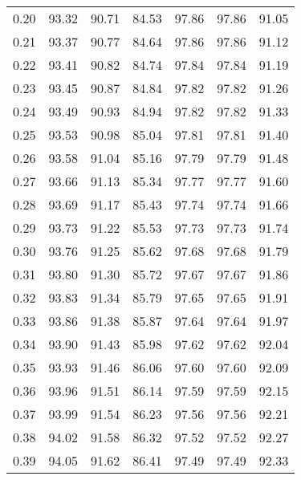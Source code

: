 \begin{tabular}{|c|c|c|c|c|c|c|}
      0.20 &     93.32 &     90.71 &      84.53 &   97.86 &      97.86 &         91.05 \\
      0.21 &     93.37 &     90.77 &      84.64 &   97.86 &      97.86 &         91.12 \\
      0.22 &     93.41 &     90.82 &      84.74 &   97.84 &      97.84 &         91.19 \\
      0.23 &     93.45 &     90.87 &      84.84 &   97.82 &      97.82 &         91.26 \\
      0.24 &     93.49 &     90.93 &      84.94 &   97.82 &      97.82 &         91.33 \\
      0.25 &     93.53 &     90.98 &      85.04 &   97.81 &      97.81 &         91.40 \\
      0.26 &     93.58 &     91.04 &      85.16 &   97.79 &      97.79 &         91.48 \\
      0.27 &     93.66 &     91.13 &      85.34 &   97.77 &      97.77 &         91.60 \\
      0.28 &     93.69 &     91.17 &      85.43 &   97.74 &      97.74 &         91.66 \\
      0.29 &     93.73 &     91.22 &      85.53 &   97.73 &      97.73 &         91.74 \\
      0.30 &     93.76 &     91.25 &      85.62 &   97.68 &      97.68 &         91.79 \\
      0.31 &     93.80 &     91.30 &      85.72 &   97.67 &      97.67 &         91.86 \\
      0.32 &     93.83 &     91.34 &      85.79 &   97.65 &      97.65 &         91.91 \\
      0.33 &     93.86 &     91.38 &      85.87 &   97.64 &      97.64 &         91.97 \\
      0.34 &     93.90 &     91.43 &      85.98 &   97.62 &      97.62 &         92.04 \\
      0.35 &     93.93 &     91.46 &      86.06 &   97.60 &      97.60 &         92.09 \\
      0.36 &     93.96 &     91.51 &      86.14 &   97.59 &      97.59 &         92.15 \\
      0.37 &     93.99 &     91.54 &      86.23 &   97.56 &      97.56 &         92.21 \\
      0.38 &     94.02 &     91.58 &      86.32 &   97.52 &      97.52 &         92.27 \\
      0.39 &     94.05 &     91.62 &      86.41 &   97.49 &      97.49 &         92.33 \\

\end{tabular}
